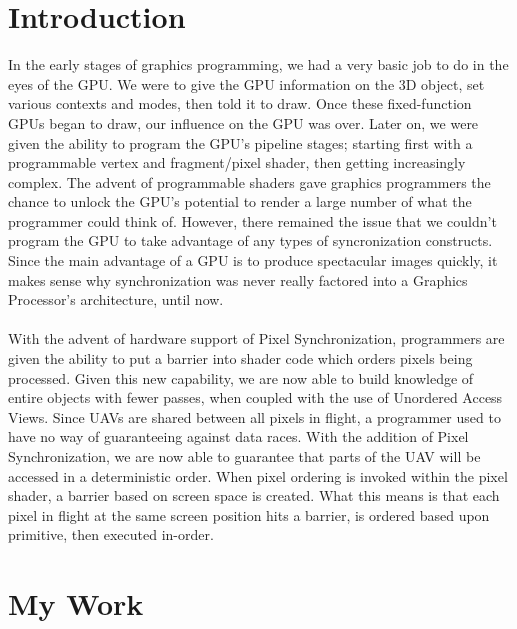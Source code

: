 \documentclass{article}
\begin{document}
\begin{multicols*}{2}  

\section*{\textbf{Introduction}}

\vspace{-1ex}

In the early stages of graphics programming, we had a very basic job to do in
the eyes of the GPU. We were to give the GPU information on the 3D object, set
various contexts and modes, then told it to draw. Once these fixed-function
GPUs began to draw, our influence on the GPU was over. Later on, we were given
the ability to program the GPU's pipeline stages; starting first with a
programmable vertex and fragment/pixel shader, then getting increasingly
complex. The advent of programmable shaders gave graphics programmers the
chance to unlock the GPU's potential to render a large number of what the
programmer could think of. However, there remained the issue that we couldn't
program the GPU to take advantage of any types of syncronization constructs.
Since the main advantage of a GPU is to produce spectacular images quickly, it
makes sense why synchronization was never really factored into a Graphics
Processor's architecture, until now.\\ \\  With the advent of hardware support
of Pixel Synchronization, programmers are given the ability to put a barrier
into shader code which orders pixels being processed. Given this new
capability, we are now able to build knowledge of entire objects with fewer
passes, when coupled with the use of Unordered Access Views. Since UAVs are
shared between all pixels in flight, a programmer used to have no way of
guaranteeing against data races. With the addition of Pixel Synchronization,
we are now able to guarantee that parts of the UAV will be accessed in a
deterministic order. When pixel ordering is invoked within the pixel shader, a
barrier based on screen space is created. What this means is that each pixel
in flight at the same screen position hits a barrier, is ordered based upon
primitive, then executed in-order.

\noindent\makebox[\linewidth]{\rule{\columnwidth}{0.4pt}}

\section*{\textbf{My Work}}


\end{multicols*}
\end{document}
